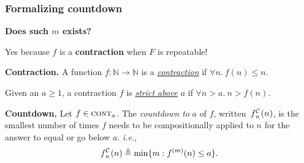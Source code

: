\begin{frame}
\frametitle{Formalizing countdown}

\textbf{Does such $m$ exists?}

Yes because $f$ is a \textbf{contraction} when $F$ is repeatable!

\bigskip

\pause 
\textbf{Contraction.} A function $f : \mathbb{N} \to \mathbb{N}$ is a
\href{https://github.com/inv-ack/inv-ack/blob/7270e64a2600b771f2b1b1b151f7d13fb2ae6c97/countdown.v\#L40-L42}{\emph{contraction}} if $\forall n.~ f(n) \le n$.

Given an $a \ge 1$, a contraction $f$ is
\href{https://github.com/inv-ack/inv-ack/blob/7270e64a2600b771f2b1b1b151f7d13fb2ae6c97/countdown.v\#L44-L46}{\emph{strict above}} $a$ if $\forall n > a.~n > f(n)$.

%

\bigskip

\pause 
\textbf{Countdown.} Let $f\in \text{\scshape{cont}}_a$. The \textit{countdown to} $a$ of $f$, written~$\cdt{f}{a}(n)$, is the smallest number of times $f$ needs to be compositionally applied to
$n$ for the answer to equal or go below $a$. \emph{i.e.},
\begin{equation*}
\cdt{f}{a}(n) \triangleq \min\{m: f^{(m)}(n)\le a \}.
\end{equation*}

\pause
{}

\end{frame}



